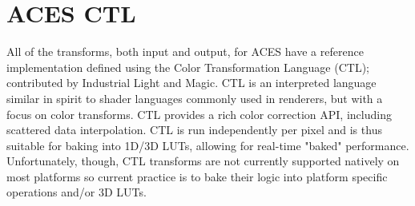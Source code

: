 \section{ACES CTL}%
\label{sec:aces-ctl}

All of the transforms, both input and output, for ACES have a reference implementation defined using the Color Transformation Language (CTL); contributed by Industrial Light and Magic. CTL is an interpreted language similar in spirit to shader languages commonly used in renderers, but with a focus on color transforms. CTL provides a rich color correction API, including scattered data interpolation. CTL is run independently per pixel and is thus suitable for baking into 1D/3D LUTs, allowing for real-time "baked" performance. Unfortunately, though, CTL transforms are not currently supported natively on most platforms so current practice is to bake their logic into platform specific operations and/or 3D LUTs.

